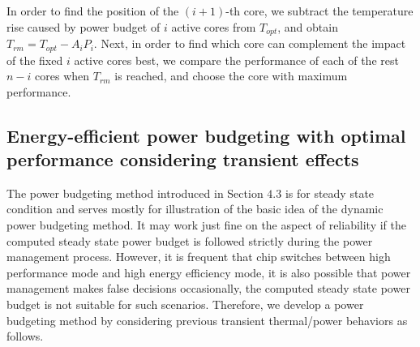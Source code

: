 In order to find the position of the $(i+1)$-th core, we subtract the
temperature rise caused by power budget of $i$ active cores from $T_{opt}$,
and obtain $T_{rm}=T_{opt}-A_iP_i$. Next, in order to find which core can complement the impact of the fixed $i$ active cores best, we compare the performance of each of the rest $n-i$ cores when $T_{rm}$ is reached, and choose the core with maximum performance.







\subsection{Energy-efficient power budgeting with optimal performance considering transient effects}
The power budgeting method introduced in Section $4.3$ is for steady state condition and serves mostly for illustration of the basic idea of the dynamic power budgeting method. It may work just fine on the aspect of reliability if the computed steady state power budget is followed strictly during the power management process. However, it is frequent that chip switches between high performance mode and high energy efficiency mode, it is also possible that power management makes false decisions occasionally, the computed steady state power budget is not suitable for such scenarios. Therefore, we develop a power budgeting method by considering previous transient thermal/power behaviors as follows.

